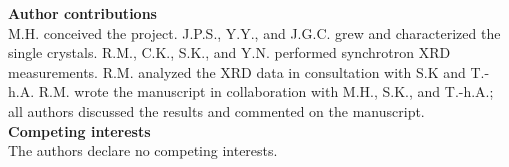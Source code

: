 \documentclass[aps,12pt,floatfix,longbibliography,a4paper]{revtex4-2}
\begin{document}
\bigskip
\textbf{Author contributions}\\
M.H. conceived the project. J.P.S., Y.Y., and J.G.C. grew and characterized the single crystals. R.M., C.K., S.K., and Y.N. performed synchrotron XRD measurements. R.M. analyzed the XRD data in consultation with S.K and T.-h.A. R.M. wrote the manuscript in collaboration with M.H., S.K., and T.-h.A.; all authors discussed the results and commented on the manuscript.\\

\textbf{Competing interests}\\
The authors declare no competing interests.\\
\end{document}
